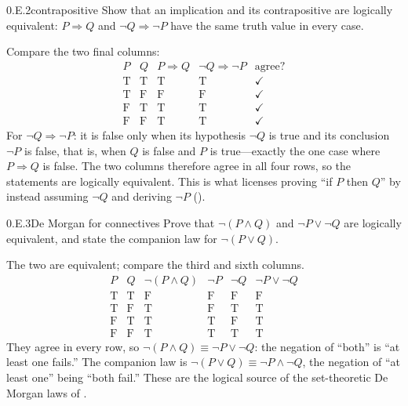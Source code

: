 \documentclass[main.tex]{subfiles}
\begin{document}
\begin{Exercise}{0.E.2}{contrapositive}
Show that an implication and its contrapositive are logically equivalent: $P\Rightarrow Q$ and
$\neg Q\Rightarrow\neg P$ have the same truth value in every case.
\end{Exercise}
\begin{Solution}
Compare the two final columns:
\[
\begin{array}{cc|cc|c}
P & Q & P\Rightarrow Q & \neg Q\Rightarrow\neg P & \text{agree?}\\\hline
\mathrm{T}&\mathrm{T}&\mathrm{T}&\mathrm{T}&\checkmark\\
\mathrm{T}&\mathrm{F}&\mathrm{F}&\mathrm{F}&\checkmark\\
\mathrm{F}&\mathrm{T}&\mathrm{T}&\mathrm{T}&\checkmark\\
\mathrm{F}&\mathrm{F}&\mathrm{T}&\mathrm{T}&\checkmark
\end{array}
\]
For $\neg Q\Rightarrow\neg P$: it is false only when its hypothesis $\neg Q$ is true and its
conclusion $\neg P$ is false, that is, when $Q$ is false and $P$ is true---exactly the one case where
$P\Rightarrow Q$ is false. The two columns therefore agree in all four rows, so the statements are
logically equivalent. This is what licenses proving ``if $P$ then $Q$'' by instead assuming $\neg Q$
and deriving $\neg P$ ().
\end{Solution}

\begin{Exercise}{0.E.3}{De Morgan for connectives}
Prove that $\neg(P\wedge Q)$ and $\neg P\vee\neg Q$ are logically equivalent, and state the companion
law for $\neg(P\vee Q)$.
\end{Exercise}
\begin{Solution}
The two are equivalent; compare the third and sixth columns.
\[
\begin{array}{cc|c|cc|c}
P & Q & \neg(P\wedge Q) & \neg P & \neg Q & \neg P\vee\neg Q\\\hline
\mathrm T&\mathrm T&\mathrm F&\mathrm F&\mathrm F&\mathrm F\\
\mathrm T&\mathrm F&\mathrm T&\mathrm F&\mathrm T&\mathrm T\\
\mathrm F&\mathrm T&\mathrm T&\mathrm T&\mathrm F&\mathrm T\\
\mathrm F&\mathrm F&\mathrm T&\mathrm T&\mathrm T&\mathrm T
\end{array}
\]
They agree in every row, so $\neg(P\wedge Q)\equiv\neg P\vee\neg Q$: the negation of ``both'' is ``at
least one fails.'' The companion law is $\neg(P\vee Q)\equiv\neg P\wedge\neg Q$, the negation of ``at
least one'' being ``both fail.'' These are the logical source of the set-theoretic De Morgan laws of
.
\end{Solution}
\end{document}
